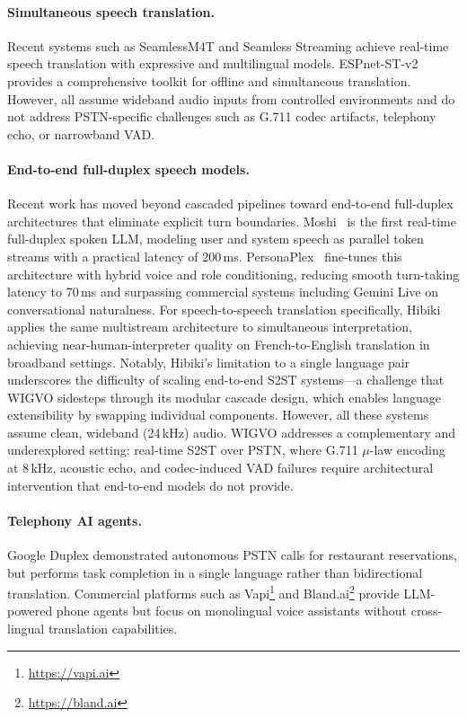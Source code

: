 \documentclass[11pt]{article}
\begin{document}
\paragraph{Simultaneous speech translation.}
Recent systems such as SeamlessM4T \citep{seamless_m4t_2023} and Seamless Streaming \citep{seamless_streaming_2023} achieve real-time speech translation with expressive and multilingual models. ESPnet-ST-v2 \citep{espnet_st_v2_2023} provides a comprehensive toolkit for offline and simultaneous translation. However, all assume wideband audio inputs from controlled environments and do not address PSTN-specific challenges such as G.711 codec artifacts, telephony echo, or narrowband VAD.

\paragraph{End-to-end full-duplex speech models.}
Recent work has moved beyond cascaded pipelines toward end-to-end full-duplex architectures that eliminate explicit turn boundaries. Moshi~\citep{defossez2024moshi} is the first real-time full-duplex spoken LLM, modeling user and system speech as parallel token streams with a practical latency of 200\,ms. PersonaPlex~\citep{roy2026personaplex} fine-tunes this architecture with hybrid voice and role conditioning, reducing smooth turn-taking latency to 70\,ms and surpassing commercial systems including Gemini Live on conversational naturalness. For speech-to-speech translation specifically, Hibiki~\citep{labiausse2025hibiki} applies the same multistream architecture to simultaneous interpretation, achieving near-human-interpreter quality on French-to-English translation in broadband settings. Notably, Hibiki's limitation to a single language pair underscores the difficulty of scaling end-to-end S2ST systems---a challenge that WIGVO sidesteps through its modular cascade design, which enables language extensibility by swapping individual components. However, all these systems assume clean, wideband (24\,kHz) audio. WIGVO addresses a complementary and underexplored setting: real-time S2ST over PSTN, where G.711 $\mu$-law encoding at 8\,kHz, acoustic echo, and codec-induced VAD failures require architectural intervention that end-to-end models do not provide.

\paragraph{Telephony AI agents.}
Google Duplex \citep{google_duplex_2018} demonstrated autonomous PSTN calls for restaurant reservations, but performs task completion in a single language rather than bidirectional translation. Commercial platforms such as Vapi\footnote{\url{https://vapi.ai}} and Bland.ai\footnote{\url{https://bland.ai}} provide LLM-powered phone agents but focus on monolingual voice assistants without cross-lingual translation capabilities.
\end{document}
